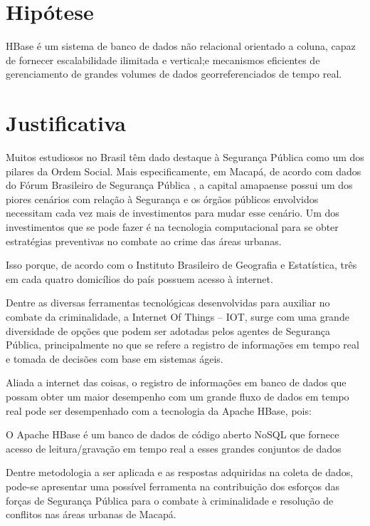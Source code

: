 \section {Hipótese}

HBase é um sistema de banco de dados não relacional orientado a coluna, capaz de fornecer escalabilidade ilimitada e vertical;e mecanismos eficientes de gerenciamento de grandes volumes de dados georreferenciados de tempo real.

\section {Justificativa}
Muitos estudiosos no Brasil têm dado destaque à Segurança Pública como um dos pilares da Ordem Social. Mais especificamente, em Macapá, de acordo com dados do Fórum Brasileiro de Segurança Pública \cite{forumdeseguranca:2018}, a capital amapaense possui um dos piores cenários com relação à Segurança e os órgãos públicos envolvidos necessitam cada vez mais de investimentos para mudar esse cenário. Um dos investimentos que se pode fazer é na tecnologia computacional para se obter estratégias preventivas no combate ao crime das áreas urbanas.

Isso porque, de acordo com o Instituto Brasileiro de Geografia e Estatística, três em cada quatro domicílios do país possuem acesso à internet\cite{IBGE-2018}.

Dentre as diversas ferramentas tecnológicas desenvolvidas para auxiliar no combate da criminalidade, a Internet Of Things -- IOT, surge com uma grande diversidade de opções que podem ser adotadas pelos agentes de Segurança Pública, principalmente no que se refere a registro de informações em tempo real e tomada de decisões com base em sistemas ágeis.

Aliada a internet das coisas, o registro de informações em banco de dados que possam obter um maior desempenho com um grande fluxo de dados em tempo real pode ser desempenhado com a tecnologia da Apache HBase, pois:

O Apache HBase é um banco de dados de código aberto NoSQL que fornece acesso de leitura/gravação em tempo real a esses grandes conjuntos de dados\cite{CETAX}

Dentre metodologia a ser aplicada e as respostas adquiridas na coleta de dados, pode-se apresentar uma possível ferramenta na contribuição dos esforços das forças de Segurança Pública para o combate à criminalidade e resolução de conflitos nas áreas urbanas de Macapá.
 
